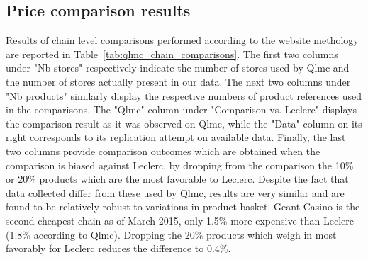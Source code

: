 \documentclass[english]{article}
\begin{document}
\subsection{Price comparison results}

Results of chain level comparisons performed according to the website methology are reported in Table~\ref{tab:qlmc_chain_comparisons}. The first two columns under "Nb stores" respectively indicate the number of stores used by Qlmc and the number of stores actually present in our data. The next two columns under "Nb products" similarly display the respective numbers of product references used in the comparisons. The "Qlmc" column under "Comparison vs. Leclerc" displays the comparison result as it was observed on Qlmc, while the "Data" column on its right corresponds to its replication attempt on available data. Finally, the last two columns provide comparison outcomes which are obtained when the comparison is biased against Leclerc, by dropping from the comparison the 10\% or 20\% products which are the most favorable to Leclerc. Despite the fact that data collected differ from these used by Qlmc, results are very similar and are found to be relatively robust to variations in product basket. Geant Casino is the second cheapest chain as of March 2015, only 1.5\% more expensive than Leclerc (1.8\% according to Qlmc). Dropping the 20\% products which weigh in most favorably for Leclerc reduces the difference to 0.4\%.
\end{document}
